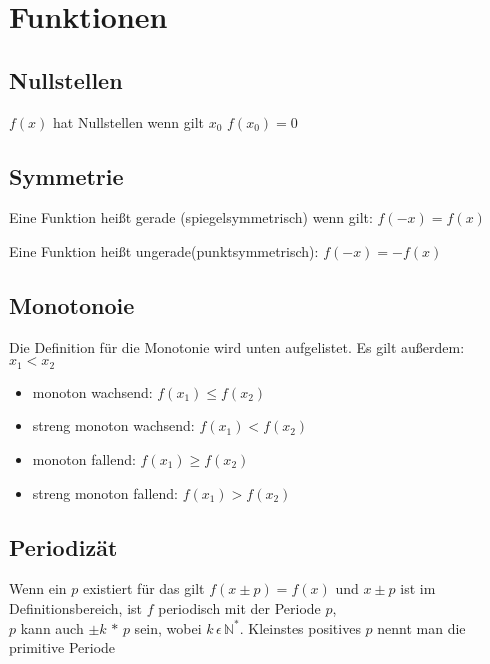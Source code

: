 \documentclass[a4paper]{scrartcl}
\begin{document}
    \section{Funktionen}

    \subsection{Nullstellen}
    $f(x)$ hat Nullstellen wenn gilt $x_0$  $f(x_0) = 0$

    \subsection{Symmetrie}
    \begin{description}
        \item Eine Funktion heißt gerade (spiegelsymmetrisch) wenn gilt: $f(-x) = f(x)$ 
        \item Eine Funktion heißt ungerade(punktsymmetrisch): $f(-x) = -f(x)$
    \end{description}
    
    \subsection{Monotonoie} 
    Die Definition für die Monotonie wird unten aufgelistet. Es gilt außerdem: $x_1 < x_2 $ 
    \begin{itemize}
        \item monoton wachsend:  $f(x_1) \leq f(x_2)$
        \item streng monoton wachsend: $f(x_1) < f(x_2)$
        \item monoton fallend:  $f(x_1) \geq f(x_2)$
        \item streng monoton fallend:  $f(x_1) > f(x_2)$
    \end{itemize}
    
    \subsection{Periodizät}
    Wenn ein $p$ existiert für das gilt $f(x \pm p) = f(x)$ und $x \pm p$ ist im Definitionsbereich, ist $f$ periodisch mit der Periode $p$,\\
    $p$ kann auch $\pm k \, * \,p$ sein, wobei $k \, \epsilon \, \mathbb{N}^*$. Kleinstes positives $p$ nennt man die primitive Periode
    
\end{document}

